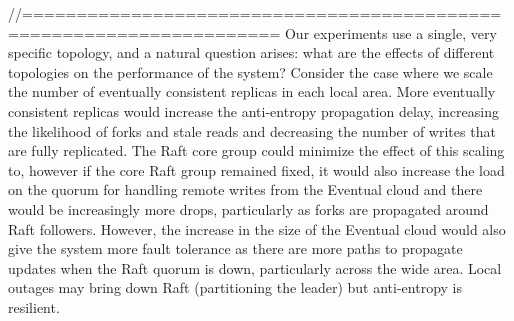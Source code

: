 //=====================================================================
Our experiments use a single, very specific topology, and a natural question
arises: what are the effects of different topologies on the performance of the
system?
Consider the case where we scale the number of eventually consistent replicas
in each local area.
More eventually consistent replicas would increase the anti-entropy
propagation delay, increasing the likelihood of forks and stale reads and
decreasing the number of writes that are fully replicated.
The Raft core group could minimize the effect of this scaling to, however if
the core Raft group remained fixed, it would also increase the load on the
quorum for handling remote writes from the Eventual cloud and there would be
increasingly more drops, particularly as forks are propagated around Raft
followers.
However, the increase in the size of the Eventual cloud would also give the
system more fault tolerance as there are more paths to propagate updates when
the Raft quorum is down, particularly across the wide area.
Local outages may bring down Raft (partitioning the leader) but anti-entropy
is resilient.
